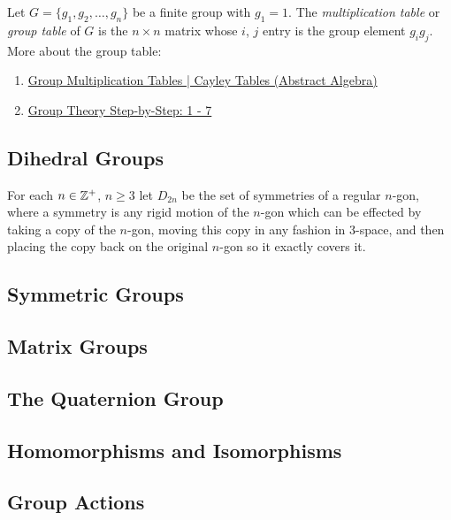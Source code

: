 {Let $G=\{g_{1},g_{2},\dots,g_{n}\}$ be a finite group with $g_{1} = 1$.
The {\sl multiplication table} or {\sl group table} of $G$ is the $n\times n$ matrix
whose $i$, $j$ entry is the group element $g_{i}g_{j}$.
}
More about the group table:
\begin{enumerate}[leftmargin=20pt, itemsep=0pt, topsep=0pt]
    \item \href{https://youtu.be/BwHspSCXFNM?si=1ucTvpLN6bGUYX9v}{Group Multiplication Tables | Cayley Tables (Abstract Algebra)}
    \item \href{https://youtu.be/tGCqP2ytP14?si=3P4tafGvrpjJWQyd}{Group Theory Step-by-Step: 1 - 7}
\end{enumerate}

\newpage
\thispagestyle{evenpagestyle}
\subsection{Dihedral Groups}
For each $n\in \mathbb{Z}^{+}$, $n\ge 3$ let $D_{2n}$ be the set of symmetries
of a regular $n$-gon, where a symmetry is any rigid motion of the $n$-gon which can
be effected by taking a copy of the $n$-gon, moving this copy in any fashion in $3$-space,
and then placing the copy back on the original $n$-gon so it exactly covers it.









\subsection{Symmetric Groups}









\subsection{Matrix Groups}









\subsection{The Quaternion Group}









\subsection{Homomorphisms and Isomorphisms}









\subsection{Group Actions}








